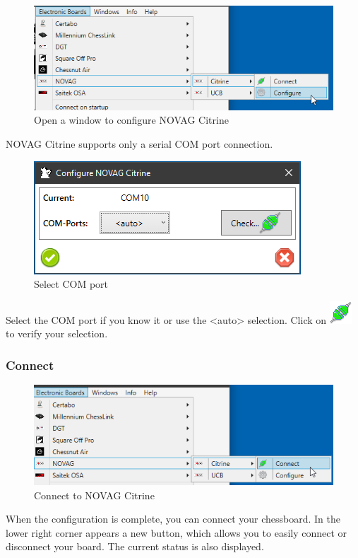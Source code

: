 \documentclass[11pt,a4paper]{article}
\begin{document}
\begin{figure}[H]
	\centering
	\includegraphics[scale=0.8]{NovagCitrine1.png}
	\caption{Open a window to configure NOVAG Citrine }
	\label{fig:NovagCtrine1}
\end{figure}

NOVAG Citrine supports only a serial COM port connection.

\begin{figure}[H]
	\centering
	\includegraphics[scale=1.0]{NovagCitrine2.png}
	\caption{Select COM port}
	\label{fig:NovagCtrine2}
\end{figure}

Select the COM port if you know it or use the <auto> selection. 
Click on \includegraphics[scale=0.5]{connect.png} to verify your selection.

\subsubsection{Connect}
\begin{figure}[H]
	\centering
	\includegraphics[scale=0.8]{NovagCitrine3.png}
	\caption{Connect to NOVAG Citrine}
	\label{fig:NovagCitrine3}
\end{figure}
When the configuration is complete, you can connect your chessboard.
In the lower right corner appears a new button, which allows you to easily connect or disconnect your board. The current status is also displayed.
\end{document}
